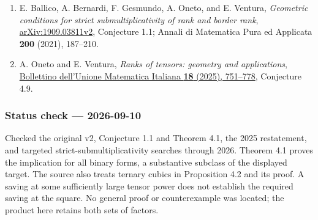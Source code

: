 \documentclass[11pt,a4paper]{article}
\providecommand{\tightlist}{\setlength{\itemsep}{0pt}\setlength{\parskip}{0pt}}
\begin{document}
\begin{enumerate}
\def\labelenumi{\arabic{enumi}.}
\tightlist
\item
  E. Ballico, A. Bernardi, F. Gesmundo, A. Oneto, and E. Ventura,
  \emph{Geometric conditions for strict submultiplicativity of rank and
  border rank},
  \href{https://arxiv.org/html/1909.03811v2}{arXiv:1909.03811v2},
  Conjecture 1.1; Annali di Matematica Pura ed Applicata \textbf{200}
  (2021), 187--210.
\item
  A. Oneto and E. Ventura, \emph{Ranks of tensors: geometry and
  applications},
  \href{https://doi.org/10.1007/s40574-025-00472-9}{Bollettino
  dell'Unione Matematica Italiana \textbf{18} (2025), 751--778},
  Conjecture 4.9.
\end{enumerate}

\subsubsection{Status check ---
2026-09-10}\label{status-check-2026-09-10}

Checked the original v2, Conjecture 1.1 and Theorem 4.1, the 2025
restatement, and targeted strict-submultiplicativity searches through
2026. Theorem 4.1 proves the implication for all binary forms, a
substantive subclass of the displayed target. The source also treats
ternary cubics in Proposition 4.2 and its proof. A saving at some
sufficiently large tensor power does not establish the required saving
at the square. No general proof or counterexample was located; the
product here retains both sets of factors.
\end{document}
